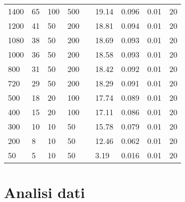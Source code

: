 \documentclass{article}
\begin{document}
\begin{table}[H]
\begin{tabular}{|l|l|l|l|l|l|l|l|l|}
        1400          & 65                        & 100                       & 500                        &  & 19.14      & 0.096                      & 0.01                       & 20                         \\ \cline{1-4} \cline{6-9}
        1200          & 41                        & 50                        & 200                        &  & 18.81      & 0.094                      & 0.01                       & 20                         \\ \cline{1-4} \cline{6-9}
        1080          & 38                        & 50                        & 200                        &  & 18.69      & 0.093                      & 0.01                       & 20                         \\ \cline{1-4} \cline{6-9}
        1000          & 36                        & 50                        & 200                        &  & 18.58      & 0.093                      & 0.01                       & 20                         \\ \cline{1-4} \cline{6-9}
        800           & 31                        & 50                        & 200                        &  & 18.42      & 0.092                      & 0.01                       & 20                         \\ \cline{1-4} \cline{6-9}
        720           & 29                        & 50                        & 200                        &  & 18.29      & 0.091                      & 0.01                       & 20                         \\ \cline{1-4} \cline{6-9}
        500           & 18                        & 20                        & 100                        &  & 17.74      & 0.089                      & 0.01                       & 20                         \\ \cline{1-4} \cline{6-9}
        400           & 15                        & 20                        & 100                        &  & 17.11      & 0.086                      & 0.01                       & 20                         \\ \cline{1-4} \cline{6-9}
        300           & 10                        & 10                        & 50                         &  & 15.78      & 0.079                      & 0.01                       & 20                         \\ \cline{1-4} \cline{6-9}
        200           & 8                         & 10                        & 50                         &  & 12.46      & 0.062                      & 0.01                       & 20                         \\ \cline{1-4} \cline{6-9}
        50            & 5                         & 10                        & 50                         &  & 3.19       & 0.016                      & 0.01                       & 20                         \\ \cline{1-4} \cline{6-9}
    \end{tabular}
\end{table}

\section{Analisi dati}
\end{document}
